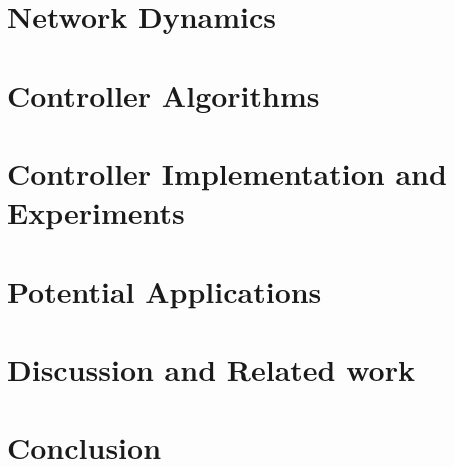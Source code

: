\documentclass[12pt]{report}
\begin{document}
\chapter{Network Dynamics}


\chapter{Controller Algorithms}


\chapter{Controller Implementation and Experiments}


\chapter{Potential Applications}


\chapter{Discussion and Related work}


\chapter{Conclusion}



\printbibliography
\end{document}
